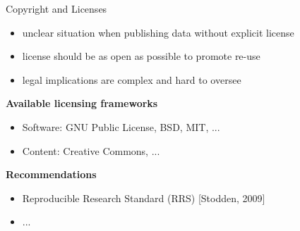 \documentclass{intbeamer}
\begin{document}
\begin{frame}{Copyright and Licenses}


\begin{itemize}
\item unclear situation when publishing data without explicit license
\item license should be as open as possible to promote re-use
\item legal implications are complex and hard to oversee
\end{itemize}

\vfill

\textbf{Available licensing frameworks}
\begin{itemize}
\item Software: GNU Public License, BSD, MIT, ...
\item Content: Creative Commons, ...
\end{itemize}

\vfill

\textbf{Recommendations}
\begin{itemize}
\item Reproducible Research Standard (RRS) [Stodden, 2009]
\item ...
\end{itemize}

\end{frame}
\end{document}
